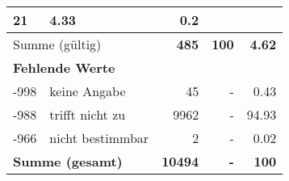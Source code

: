 \begin{longtable}{lXrrr}
       \num{21} &
       \num[round-mode=places,round-precision=2]{4.33} &
         \num[round-mode=places,round-precision=2]{0.2} \\
     \midrule
     \multicolumn{2}{l}{Summe (gültig)} &
       \textbf{\num{485}} &
     \textbf{\num{100}} &
       \textbf{\num[round-mode=places,round-precision=2]{4.62}} \\
     \multicolumn{5}{l}{\textbf{Fehlende Werte}}\\
       -998 &
       keine Angabe &
         \num{45} &
        - &
         \num[round-mode=places,round-precision=2]{0.43} \\
       -988 &
       trifft nicht zu &
         \num{9962} &
        - &
         \num[round-mode=places,round-precision=2]{94.93} \\
       -966 &
       nicht bestimmbar &
         \num{2} &
        - &
         \num[round-mode=places,round-precision=2]{0.02} \\
     \midrule
     \multicolumn{2}{l}{\textbf{Summe (gesamt)}} &
          \textbf{\num{10494}} &
        \textbf{-} &
        \textbf{\num{100}} \\
     \bottomrule
     \end{longtable}
     

